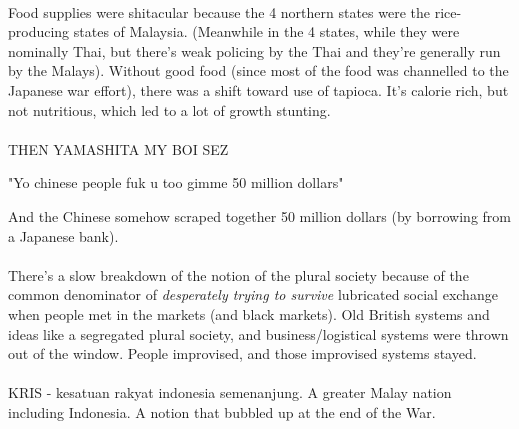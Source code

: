\documentclass[a4paper]{article}
\begin{document}
\\
Food supplies were shitacular because the 4 northern states were the rice-producing states of Malaysia. (Meanwhile in the 4 states, while they were nominally Thai, but there's weak policing by the Thai and they're generally run by the Malays). Without good food (since most of the food was channelled to the Japanese war effort), there was a shift toward use of tapioca. It's calorie rich, but not nutritious, which led to a lot of growth stunting.\\
\\
THEN YAMASHITA MY BOI SEZ

\begin{framed}
	\begin{displayquote}
		"Yo chinese people fuk u too gimme 50 million dollars"
	\end{displayquote}
\end{framed}

\noindent And the Chinese somehow scraped together 50 million dollars (by borrowing from a Japanese bank).\\
\\
There's a slow breakdown of the notion of the plural society because of the common denominator of \textit{desperately trying to survive} lubricated social exchange when people met in the markets (and black markets). Old British systems and ideas like a segregated plural society, and business/logistical systems were thrown out of the window. People improvised, and those improvised systems stayed.\\
\\
KRIS - kesatuan rakyat indonesia semenanjung. A greater Malay nation including Indonesia. A notion that bubbled up at the end of the War.
\end{document}
